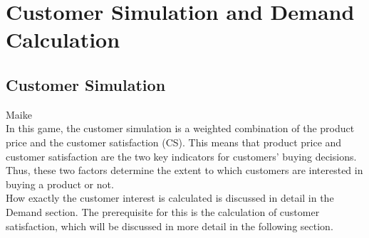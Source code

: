 \section{Customer Simulation and Demand Calculation}
\label{sec:customsim}
\subsection{Customer Simulation}
Maike\\
In this game, the customer simulation is a weighted combination of the product price and the customer satisfaction (CS). %
This means that product price and customer satisfaction are the two key indicators for customers' buying decisions. Thus, these two factors determine the extent to which customers are interested in buying a product or not.\\ %
How exactly the customer interest is calculated is discussed in detail in the Demand section. The prerequisite for this is the calculation of customer satisfaction, which will be discussed in more detail in the following section.\\

